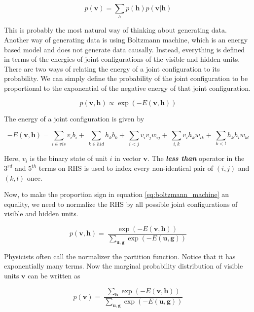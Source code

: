 \documentclass{article}
\begin{document}
\begin{equation}
p(\mathbf{v}) = \sum_{h} p(\mathbf{h})p(\mathbf{v|h})
\label{eq:causal_model}
\end{equation}   

This is probably the most natural way of thinking about generating data. Another way of generating data is using Boltzmann machine, which is an energy based model and does not generate data causally. Instead, everything is defined in terms of the energies of joint configurations of the visible and hidden units. There are two ways of relating the energy of a joint configuration to its probability. We can simply define the probability of the joint configuration to be proportional to the exponential of the negative energy of that joint configuration.

\begin{equation}
p(\mathbf{v,h}) \propto \exp(-E(\mathbf{v,h}))
\label{eq:boltzmann_machine}
\end{equation}

\noindent The energy of a joint configuration is given by

\begin{equation}
-E(\mathbf{v,h}) = \sum_{i \in vis} v_{i} b_{i} + \
\sum_{k \in hid} h_{k} b_{k} + \
\sum_{i<j} v_{i} v_{j} w_{ij} + \
\sum_{i,k} v_{i} h_{k} w_{ik} + \
\sum_{k<l} h_{k} h_{l} w_{kl}
\label{eq:joint_energy_bm}
\end{equation}

Here, $v_i$ is the binary state of unit $i$ in vector $\mathbf{v}$. The \textit{\textbf{less than}} operator in the $3^{rd}$ and $5^{th}$ terms on RHS is used to index every non-identical pair of $(i,j)$ and $(k,l)$ once. 

Now, to make the proportion sign in equation \ref{eq:boltzmann_machine} an equality, we need to normalize the RHS by all possible joint configurations of visible and hidden units.

\begin{equation}
p(\mathbf{v,h}) = \
\frac{\exp(-E(\mathbf{v,h}))} {\sum_{\mathbf{u,g}}\exp(-E(\mathbf{u,g}))}
\label{eq:boltzmann_machine_equal}
\end{equation} 

Physicists often call the normalizer the partition function. Notice that it has exponentially many terms. Now the marginal probability distribution of visible units $\mathbf{v}$ can be written as

\begin{equation}
p(\mathbf{v}) = \
\frac{\sum_{\mathbf{h}}\exp(-E(\mathbf{v,h}))} {\sum_{\mathbf{u,g}}\exp(-E(\mathbf{u,g}))}
\label{eq:boltzmann_machine_equal_vis}
\end{equation} 
\end{document}
